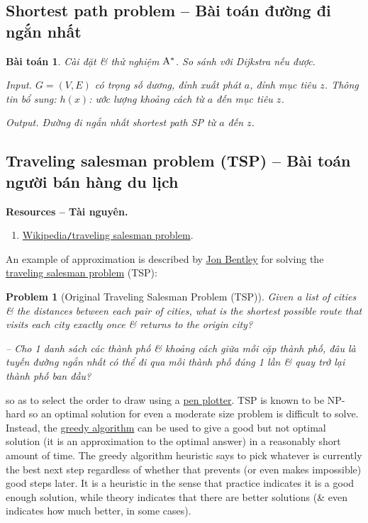 \documentclass{article}
\newtheorem{baitoan}{Bài toán}
\newtheorem{problem}{Problem}
\begin{document}

\subsection{Shortest path problem -- Bài toán đường đi ngắn nhất}

\begin{baitoan}
	Cài đặt \& thử nghiệm $\rm A^*$. So sánh với Dijkstra nếu được.
	\item {\sf Input.} $G = (V,E)$ có trọng số dương, đỉnh xuất phát $a$, đỉnh mục tiêu $z$. Thông tin bổ sung: $h(x)$: ước lượng khoảng cách từ $a$ đến mục tiêu $z$.
	\item {\sf Output.} Đường đi ngắn nhất shortest path SP từ $a$ đến $z$.
\end{baitoan}


\subsection{Traveling salesman problem (TSP) -- Bài toán người bán hàng du lịch}
\textbf{\textbf{Resources -- Tài nguyên.}}
\begin{enumerate}
	\item \href{https://en.wikipedia.org/wiki/Travelling_salesman_problem}{Wikipedia{\tt/}traveling salesman problem}.
\end{enumerate}
An example of approximation is described by \href{https://en.wikipedia.org/wiki/Jon_Bentley_(computer_scientist)}{\sc Jon Bentley} for solving the \href{https://en.wikipedia.org/wiki/Travelling_salesman_problem}{traveling salesman problem} (TSP):

\begin{problem}[Original Traveling Salesman Problem (TSP)]
	Given a list of cities \& the distances between each pair of cities, what is the shortest possible route that visits each city exactly once \& returns to the origin city?
	
	-- Cho 1 danh sách các thành phố \& khoảng cách giữa mỗi cặp thành phố, đâu là tuyến đường ngắn nhất có thể đi qua mỗi thành phố đúng 1 lần \& quay trở lại thành phố ban đầu?
\end{problem}
so as to select the order to draw using a \href{https://en.wikipedia.org/wiki/Pen_plotter}{pen plotter}. TSP is known to be NP-hard so an optimal solution for even a moderate size problem is difficult to solve. Instead, the \href{https://en.wikipedia.org/wiki/Greedy_algorithm}{greedy algorithm} can be used to give a good but not optimal solution (it is an approximation to the optimal answer) in a reasonably short amount of time. The greedy algorithm heuristic says to pick whatever is currently the best next step regardless of whether that prevents (or even makes impossible) good steps later. It is a heuristic in the sense that practice indicates it is a good enough solution, while theory indicates that there are better solutions (\& even indicates how much better, in some cases).
\end{document}
